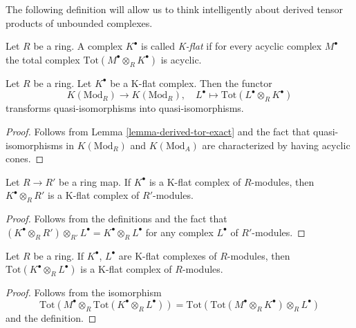 \noindent
The following definition will allow us to think intelligently
about derived tensor products of unbounded complexes.

\begin{definition}
\label{definition-K-flat}
Let $R$ be a ring. A complex $K^\bullet$ is called {\it K-flat}
if for every acyclic complex $M^\bullet$ the total complex
$\text{Tot}(M^\bullet \otimes_R K^\bullet)$ is acyclic.
\end{definition}

\begin{lemma}
\label{lemma-K-flat-quasi-isomorphism}
Let $R$ be a ring. Let $K^\bullet$ be a K-flat complex.
Then the functor
$$
K(\text{Mod}_R) \longrightarrow K(\text{Mod}_R), \quad
L^\bullet \longmapsto \text{Tot}(L^\bullet \otimes_R K^\bullet)
$$
transforms quasi-isomorphisms into quasi-isomorphisms.
\end{lemma}

\begin{proof}
Follows from
Lemma \ref{lemma-derived-tor-exact}
and the fact that quasi-isomorphisms in $K(\text{Mod}_R)$ and
$K(\text{Mod}_A)$ are characterized by having acyclic cones.
\end{proof}

\begin{lemma}
\label{lemma-base-change-K-flat}
Let $R \to R'$ be a ring map. If $K^\bullet$ is a K-flat complex
of $R$-modules, then $K^\bullet \otimes_R R'$ is a K-flat complex
of $R'$-modules.
\end{lemma}

\begin{proof}
Follows from the definitions and the fact that
$(K^\bullet \otimes_R R') \otimes_{R'} L^\bullet =
K^\bullet \otimes_R L^\bullet$ for any complex
$L^\bullet$ of $R'$-modules.
\end{proof}

\begin{lemma}
\label{lemma-tensor-product-K-flat}
Let $R$ be a ring. If $K^\bullet$, $L^\bullet$ are K-flat complexes
of $R$-modules, then $\text{Tot}(K^\bullet \otimes_R L^\bullet)$ is a
K-flat complex of $R$-modules.
\end{lemma}

\begin{proof}
Follows from the isomorphism
$$
\text{Tot}(M^\bullet \otimes_R \text{Tot}(K^\bullet \otimes_R L^\bullet))
=
\text{Tot}(\text{Tot}(M^\bullet \otimes_R K^\bullet) \otimes_R L^\bullet)
$$
and the definition.
\end{proof}

